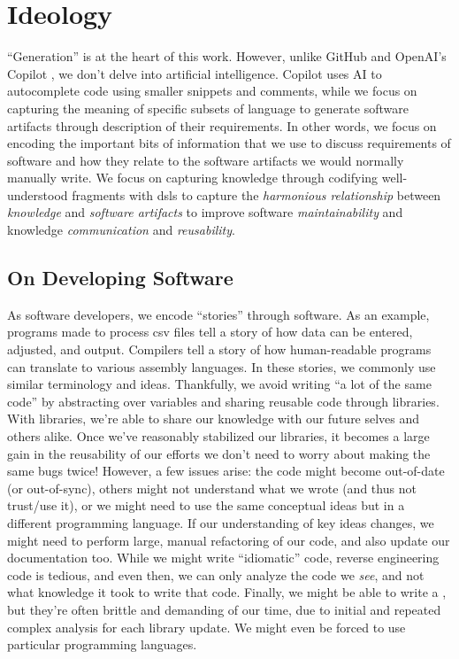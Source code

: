 \chapter[Ideology]{Ideology\footnotemark}
\label{chap:ideology}

``Generation'' is at the heart of this work. However, unlike GitHub and OpenAI's
Copilot \cite{Copilot}, we don't delve into artificial intelligence. Copilot
uses AI to autocomplete code using smaller snippets and comments, while we focus
on capturing the meaning of specific subsets of language to generate software
artifacts through description of their requirements. In other words, we focus on
encoding the important bits of information that we use to discuss requirements
of software and how they relate to the software artifacts we would normally
manually write. We focus on capturing knowledge through codifying
well-understood fragments with \acsp{dsl} to capture the \textit{harmonious
relationship} between \textit{knowledge} and \textit{software artifacts} to
improve software \textit{maintainability} and knowledge \textit{communication}
and \textit{reusability}.

\section{On Developing Software}
\label{chap:ideology:sec:on_developing_software}

As software developers, we encode ``stories'' through software. As an example,
programs made to process \acs{csv} files tell a story of how data can be
entered, adjusted, and output. Compilers tell a story of how human-readable
programs can translate to various assembly languages. In these stories, we
commonly use similar terminology and ideas. Thankfully, we avoid writing ``a lot
of the same code'' by abstracting over variables and sharing reusable code
through libraries. With libraries, we're able to share our knowledge with our
future selves and others alike. Once we've reasonably stabilized our libraries,
it becomes a large gain in the reusability of our efforts \textemdash we don't
need to worry about making the same bugs twice! However, a few issues arise: the
code might become out-of-date (or out-of-sync), others might not understand what
we wrote (and thus not trust/use it), or we might need to use the same
conceptual ideas but in a different programming language. If our understanding
of key ideas changes, we might need to perform large, manual refactoring of our
code, and also update our documentation too. While we might write ``idiomatic''
code, reverse engineering code is tedious, and even then, we can only analyze
the code we \textit{see}, and not what knowledge it took to write that code.
Finally, we might be able to write a , but they're often brittle and
demanding of our time, due to initial and repeated complex analysis for each
library update. We might even be forced to use particular programming languages.

